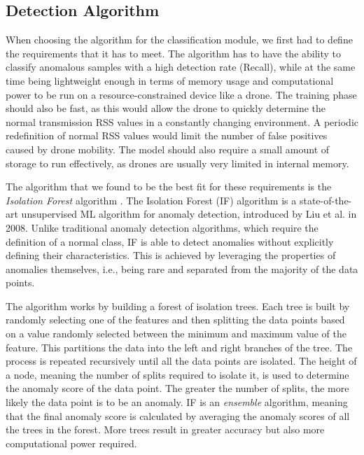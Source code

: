 \documentclass[futureinternet,article,submit,pdftex,moreauthors]{Definitions/mdpi}
\begin{document}
\subsection {Detection Algorithm}

When choosing the algorithm for the classification module, we first had to define the requirements that it has to meet. The algorithm has to have the ability to classify anomalous samples with a high detection rate (Recall), while at the same time 
being lightweight enough in terms of memory usage and computational power to be run on a resource-constrained device like a drone. The training phase should also be fast, as this would allow the drone to quickly determine the normal transmission RSS values in a constantly changing environment. A periodic redefinition of normal RSS values would 
limit the number of false positives caused by drone mobility. 
The model should also require a small amount of storage to run effectively, as drones are usually very limited in internal memory. 

The algorithm that we found to be the best fit for these requirements is the \textit{Isolation Forest} algorithm \cite{IsolationForestLiu}. The Isolation Forest (IF) algorithm is a state-of-the-art unsupervised ML algorithm for anomaly detection, introduced by Liu et al. in 2008. 
Unlike traditional anomaly detection algorithms, which require the definition of a normal class, IF is able to detect anomalies without explicitly defining their characteristics.
This is achieved by leveraging the properties of anomalies themselves, i.e., being rare and separated from the majority of the data points. 

The algorithm works by building a forest of isolation trees. Each tree is built by randomly selecting one of the features and then splitting the data points based on a value randomly selected between the minimum and maximum value of the feature. This partitions the data into the 
left and right branches of the tree. The process is repeated recursively until all the data points are isolated. The height of a node, meaning the number of splits required to isolate it, is used to determine the anomaly score of the data point. The greater the number of splits, the more likely the data point is to be an anomaly.
IF is an \textit{ensemble} algorithm, meaning that the final anomaly score is calculated by averaging the anomaly scores of all the trees in the forest. More trees result in greater accuracy but also more computational power required.
\end{document}
